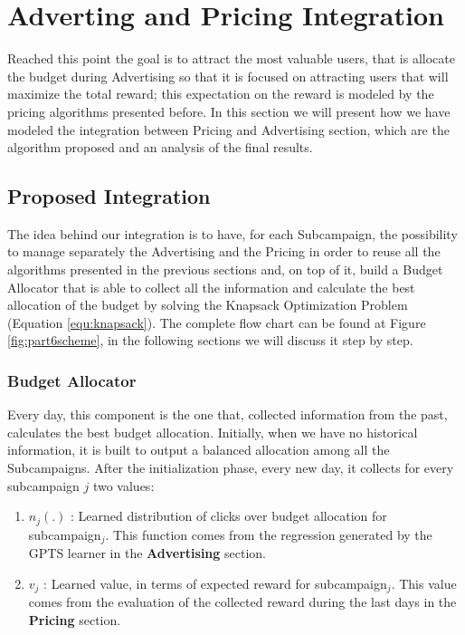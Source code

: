 \chapter{Adverting and Pricing Integration}

\setcounter{equ}{2}

Reached this point the goal is to attract the most valuable users, that is allocate the budget during Advertising so that it is focused on attracting users that will maximize the total reward; this expectation on the reward is modeled by the pricing algorithms presented before. In this section we will present how we have modeled the integration between Pricing and Advertising section, which are the algorithm proposed and an analysis of the final results.


\section{Proposed Integration}
The idea behind our integration is to have, for each Subcampaign, the possibility to manage separately the Advertising and the Pricing in order to reuse all the algorithms presented in the previous sections and, on top of it, build a Budget Allocator that is able to collect all the information and calculate the best allocation of the budget by solving the Knapsack Optimization Problem (Equation \ref{equ:knapsack}).
The complete flow chart can be found at Figure \ref{fig:part6scheme}, in the following sections we will discuss it step by step.

\subsection{Budget Allocator}
Every day, this component is the one that, collected information from the past, calculates the best budget allocation. Initially, when we have no historical information, it is built to output a balanced allocation among all the Subcampaigns. After the initialization phase, every new day, it collects for every subcampaign $ j $ two values:

\begin{enumerate}
    \item $ n_j (.) $ : Learned distribution of clicks over budget allocation for subcampaign$_j$. This function comes from the regression generated by the GPTS learner in the   \textbf{Advertising} section.
    \item $ v_j $ : Learned value, in terms of expected reward for subcampaign$_j$. This value comes from the evaluation of the collected reward during the last days in the \textbf{Pricing} section.
\end{enumerate}

